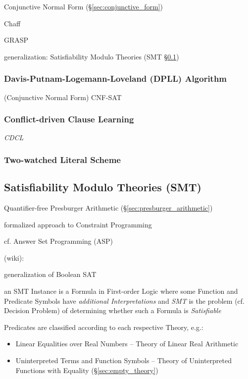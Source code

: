 Conjunctive Normal Form (\S\ref{sec:conjunctive_form})

Chaff

GRASP

generalization: Satisfiability Modulo Theories (SMT \S\ref{sec:smt})




\subsubsection{Davis-Putnam-Logemann-Loveland (DPLL) Algorithm}\label{sec:dpll}

(Conjunctive Normal Form) CNF-SAT



\subsubsection{Conflict-driven Clause Learning}\label{sec:cdcl}\hfill

\emph{CDCL}



\subsubsection{Two-watched Literal Scheme}\label{sec:twowatched_literal}\hfill



\subsection{Satisfiability Modulo Theories (SMT)}\label{sec:smt}

Quantifier-free Presburger Arithmetic
(\S\ref{sec:presburger_arithmetic})

formalized approach to Constraint Programming

cf. Answer Set Programming (ASP)

(wiki):

generalization of Boolean SAT

an SMT Instance is a Formula in First-order Logic where some Function
and Predicate Symbols have \emph{additional Interpretations} and
\emph{SMT} is the problem (cf. Decision Problem) of determining
whether such a Formula is \emph{Satisfiable}

Predicates are classified according to each respective Theory, e.g.:
\begin{itemize}
  \item Linear Equalities over Real Numbers -- Theory of Linear Real
    Arithmetic
  \item Uninterpreted Terms and Function Symbols -- Theory of
    Uninterpreted Functions with Equality (\S\ref{sec:empty_theory})
\end{itemize}

